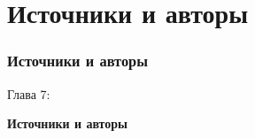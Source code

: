 %

\section{Источники и авторы}
\begin{frame}[fragile]
	\frametitle{Источники и авторы}

	\begin{center}\huge{Глава 7:}\end{center}
	\begin{center}\huge{\color{typo3darkgrey}\textbf{Источники и авторы}}\end{center}

\end{frame}


